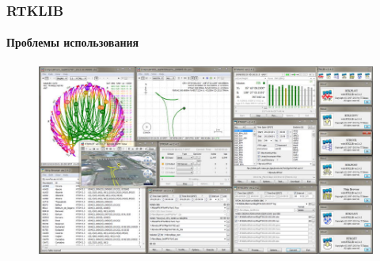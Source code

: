 \documentclass[xetex,t]{beamer}
\begin{document}
%
%
\begin{frame}
  \frametitle{RTKLIB}
  \framesubtitle{Проблемы использования}

  \begin{figure}[h]
    \centering
    \includegraphics[width=.95\textwidth]{../img/rtklib-hell}
  \end{figure}
\end{frame}


%
%
\begin{frame}[c]
\begin{center}
  \Huge\bfseries
  \color{ifmoblue}{Спасибо за внимание}
\end{center}
\end{frame}
\end{document}
